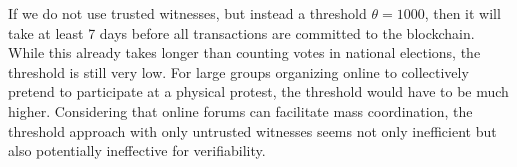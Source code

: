 If we do not use trusted witnesses, but instead a threshold \(\theta = 1000\), then it will take at least 7 days before all transactions are committed to the blockchain. 
While this already takes longer than counting votes in national elections, the threshold is still very low. 
For large groups organizing online to collectively pretend to participate at a physical protest, the threshold would have to be much higher. 
Considering that online forums can facilitate mass coordination, the threshold approach with only untrusted witnesses seems not only inefficient but also potentially ineffective for verifiability.



